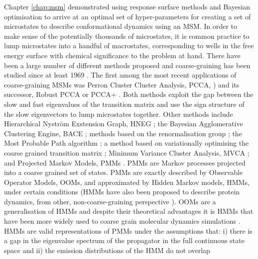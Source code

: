 Chapter \ref{chap:msm} demonstrated using response surface methods and Bayesian optimisation to arrive at an optimal set of hyper-parameters for creating a set of microstates to describe conformational dynamics using an MSM. In order to make sense of the potentially thousands of microstates, it is common practice to lump microstates into a handful of macrostates, corresponding to wells in the free energy surface with chemical significance to the problem at hand. There have been a large number of different methods proposed and coarse-graining has been studied since at least 1969 \cite{kuoLumpingAnalysisMonomolecular}\cite{weiLumpingAnalysisMonomolecular1969}. The first among the most recent applications of coarse-graining MSMs was Perron Cluster Cluster Analysis, PCCA, \cite{deuflhardIdentificationAlmostInvariant2000a}) and its successor, Robust PCCA or PCCA+ \cite{deuflhardRobustPerronCluster2005b}. Both methods exploit the gap between the slow and fast eigenvalues of the transition matrix and use the sign structure of the slow eigenvectors to lump microstates together. Other methods include Hierarchical Nystr{\"o}m Exstension Graph, HNEG \cite{yaoHierarchicalNystromMethods2013a}; the Bayesian Agglomerative Clustering Engine, BACE \cite{bowmanImprovedCoarsegrainingMarkov2012a}; methods based on the renormalisation group \cite{orioliDimensionalReductionMarkov2016c}\cite{hummerOptimalDimensionalityReduction2015a}; the Most Probable Path algorithm \cite{jainIdentifyingMetastableStates2012a}; a method based on variationally optimising the coarse grained transition matrix \cite{martiniVariationalIdentificationMarkovian2017a};  Minimum Variance Cluster Analysis, MVCA \cite{husicMinimumVarianceClustering2018}; and Projected Markov Models, PMMs \cite{noeProjectedHiddenMarkov2013a}. PMMs are Markov processes projected into a coarse grained set of states. PMMs are exactly described by Observable Operator Models, OOMs, \cite{wuProjectedMetastableMarkov2015} and approximated by Hidden Markov models, HMMs, \cite{noeProjectedHiddenMarkov2013a} under certain conditions (HMMs have also been proposed to describe protein dynamics, from other,  non-coarse-graining perspective \cite{mcgibbonUnderstandingProteinDynamics}). OOMs are a generalisation of HMMs \cite{jaegerDiscretetimeDiscretevaluedObservable} and despite their theoretical advantages it is HMMs that have been more widely used to coarse grain molecular dynamics simulations \cite{mondalAtomicResolutionMechanism2018a}\cite{plattnerCompleteProteinProtein2017}\cite{panConformationalHeterogeneityMichaelis2016}\cite{juarez-jimenezDynamicDesignManipulation2020}\cite{wangDynamicalBehaviorVLactamases2019}\cite{FastFoldingPathwaysThrombinBinding2018}\cite{remingtonFluorescenceQuenching2aminopurinelabeled2019}\cite{curado-carballadaHiddenConformationsAspergillus2019}\cite{furiniIontriggeredSelectivityBacterial2018}\cite{yangMappingPathwayDynamics2018}\cite{ahalawatMappingSubstrateRecognition2018}\cite{olaposiMembraneBoundTranscriptionFactor2019}\cite{xiaoNaBindingModes2019}\cite{hansonWhatMakesKinase2019}. HMMs are valid representations of PMMs under the assumptions that: i) there is a gap in the eigenvalue spectrum of the propagator in the full continuous state space and ii) the emission distributions of the HMM do not overlap 